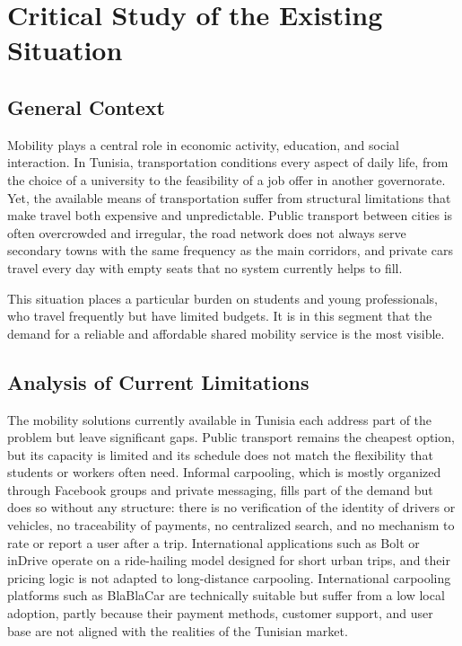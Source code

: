 \section{Critical Study of the Existing Situation}

\subsection{General Context}

Mobility plays a central role in economic activity, education, and social interaction. In Tunisia, transportation conditions every aspect of daily life, from the choice of a university to the feasibility of a job offer in another governorate. Yet, the available means of transportation suffer from structural limitations that make travel both expensive and unpredictable. Public transport between cities is often overcrowded and irregular, the road network does not always serve secondary towns with the same frequency as the main corridors, and private cars travel every day with empty seats that no system currently helps to fill.

This situation places a particular burden on students and young professionals, who travel frequently but have limited budgets. It is in this segment that the demand for a reliable and affordable shared mobility service is the most visible.

\subsection{Analysis of Current Limitations}

The mobility solutions currently available in Tunisia each address part of the problem but leave significant gaps. Public transport remains the cheapest option, but its capacity is limited and its schedule does not match the flexibility that students or workers often need. Informal carpooling, which is mostly organized through Facebook groups and private messaging, fills part of the demand but does so without any structure: there is no verification of the identity of drivers or vehicles, no traceability of payments, no centralized search, and no mechanism to rate or report a user after a trip. International applications such as Bolt or inDrive operate on a ride-hailing model designed for short urban trips, and their pricing logic is not adapted to long-distance carpooling. International carpooling platforms such as BlaBlaCar are technically suitable but suffer from a low local adoption, partly because their payment methods, customer support, and user base are not aligned with the realities of the Tunisian market.

